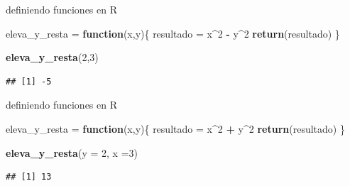 \documentclass[ignorenonframetext,]{beamer}
\newenvironment{Shaded}{\begin{snugshade}}{\end{snugshade}}
\newcommand{\ControlFlowTok}[1]{\textcolor[rgb]{0.13,0.29,0.53}{\textbf{#1}}}
\newcommand{\DataTypeTok}[1]{\textcolor[rgb]{0.13,0.29,0.53}{#1}}
\newcommand{\DecValTok}[1]{\textcolor[rgb]{0.00,0.00,0.81}{#1}}
\newcommand{\KeywordTok}[1]{\textcolor[rgb]{0.13,0.29,0.53}{\textbf{#1}}}
\newcommand{\NormalTok}[1]{#1}
\newcommand{\OperatorTok}[1]{\textcolor[rgb]{0.81,0.36,0.00}{\textbf{#1}}}
\newcommand{\StringTok}[1]{\textcolor[rgb]{0.31,0.60,0.02}{#1}}
\begin{document}
\begin{frame}[fragile]{definiendo funciones en R}
\protect\hypertarget{definiendo-funciones-en-r-2}{}

\begin{Shaded}
\begin{Highlighting}[]
\NormalTok{eleva_y_resta =}\StringTok{ }\ControlFlowTok{function}\NormalTok{(x,y)\{}
\NormalTok{  resultado =}\StringTok{ }\NormalTok{x}\OperatorTok{^}\DecValTok{2} \OperatorTok{-}\StringTok{ }\NormalTok{y}\OperatorTok{^}\DecValTok{2}
  \KeywordTok{return}\NormalTok{(resultado)}
\NormalTok{\}}

\KeywordTok{eleva_y_resta}\NormalTok{(}\DecValTok{2}\NormalTok{,}\DecValTok{3}\NormalTok{)}
\end{Highlighting}
\end{Shaded}

\begin{verbatim}
## [1] -5
\end{verbatim}

\end{frame}

\begin{frame}[fragile]{definiendo funciones en R}
\protect\hypertarget{definiendo-funciones-en-r-3}{}

\begin{Shaded}
\begin{Highlighting}[]
\NormalTok{eleva_y_resta =}\StringTok{ }\ControlFlowTok{function}\NormalTok{(x,y)\{}
\NormalTok{  resultado =}\StringTok{ }\NormalTok{x}\OperatorTok{^}\DecValTok{2} \OperatorTok{+}\StringTok{ }\NormalTok{y}\OperatorTok{^}\DecValTok{2}
  \KeywordTok{return}\NormalTok{(resultado)}
\NormalTok{\}}

\KeywordTok{eleva_y_resta}\NormalTok{(}\DataTypeTok{y =} \DecValTok{2}\NormalTok{, }\DataTypeTok{x =}\DecValTok{3}\NormalTok{)}
\end{Highlighting}
\end{Shaded}

\begin{verbatim}
## [1] 13
\end{verbatim}

\end{frame}
\end{document}
